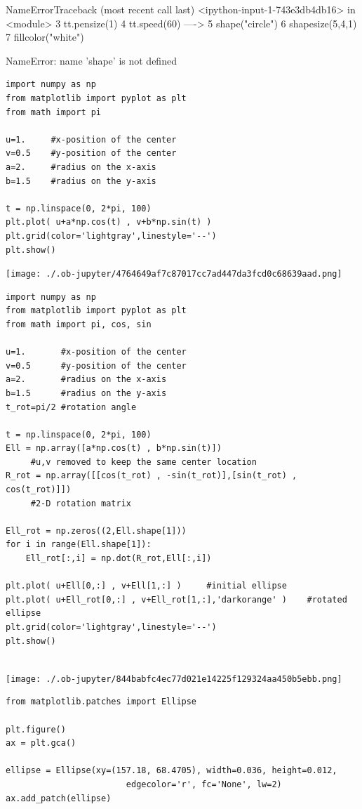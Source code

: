 \documentclass[11pt]{article}
\begin{document}
NameErrorTraceback (most recent call last)
<ipython-input-1-743e3db4db16> in <module>
      3 tt.pensize(1)
      4 tt.speed(60)
----> 5 shape("circle")
      6 shapesize(5,4,1)
      7 fillcolor("white")

NameError: name 'shape' is not defined

\begin{verbatim}
import numpy as np
from matplotlib import pyplot as plt
from math import pi

u=1.     #x-position of the center
v=0.5    #y-position of the center
a=2.     #radius on the x-axis
b=1.5    #radius on the y-axis

t = np.linspace(0, 2*pi, 100)
plt.plot( u+a*np.cos(t) , v+b*np.sin(t) )
plt.grid(color='lightgray',linestyle='--')
plt.show()
\end{verbatim}

\begin{center}
\texttt{[image: ./.ob-jupyter/4764649af7c87017cc7ad447da3fcd0c68639aad.png]}
\end{center}


\begin{verbatim}
import numpy as np
from matplotlib import pyplot as plt
from math import pi, cos, sin

u=1.       #x-position of the center
v=0.5      #y-position of the center
a=2.       #radius on the x-axis
b=1.5      #radius on the y-axis
t_rot=pi/2 #rotation angle

t = np.linspace(0, 2*pi, 100)
Ell = np.array([a*np.cos(t) , b*np.sin(t)])  
     #u,v removed to keep the same center location
R_rot = np.array([[cos(t_rot) , -sin(t_rot)],[sin(t_rot) , cos(t_rot)]])  
     #2-D rotation matrix

Ell_rot = np.zeros((2,Ell.shape[1]))
for i in range(Ell.shape[1]):
    Ell_rot[:,i] = np.dot(R_rot,Ell[:,i])

plt.plot( u+Ell[0,:] , v+Ell[1,:] )     #initial ellipse
plt.plot( u+Ell_rot[0,:] , v+Ell_rot[1,:],'darkorange' )    #rotated ellipse
plt.grid(color='lightgray',linestyle='--')
plt.show()


\end{verbatim}

\begin{center}
\texttt{[image: ./.ob-jupyter/844babfc4ec77d021e14225f129324aa450b5ebb.png]}
\end{center}

\begin{verbatim}
from matplotlib.patches import Ellipse

plt.figure()
ax = plt.gca()

ellipse = Ellipse(xy=(157.18, 68.4705), width=0.036, height=0.012, 
                        edgecolor='r', fc='None', lw=2)
ax.add_patch(ellipse)

\end{verbatim}
\end{document}
